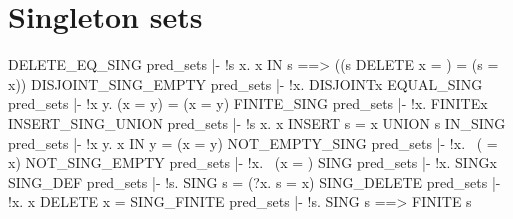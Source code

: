 \section{Singleton sets}
\THEOREM DELETE\_EQ\_SING pred\_sets
|- !s x. x IN s ==> ((s DELETE x = {}) = (s = {x}))
\ENDTHEOREM
\THEOREM DISJOINT\_SING\_EMPTY pred\_sets
|- !x. DISJOINT{x}{}
\ENDTHEOREM
\THEOREM EQUAL\_SING pred\_sets
|- !x y. ({x} = {y}) = (x = y)
\ENDTHEOREM
\THEOREM FINITE\_SING pred\_sets
|- !x. FINITE{x}
\ENDTHEOREM
\THEOREM INSERT\_SING\_UNION pred\_sets
|- !s x. x INSERT s = {x} UNION s
\ENDTHEOREM
\THEOREM IN\_SING pred\_sets
|- !x y. x IN {y} = (x = y)
\ENDTHEOREM
\THEOREM NOT\_EMPTY\_SING pred\_sets
|- !x. ~({} = {x})
\ENDTHEOREM
\THEOREM NOT\_SING\_EMPTY pred\_sets
|- !x. ~({x} = {})
\ENDTHEOREM
\THEOREM SING pred\_sets
|- !x. SING{x}
\ENDTHEOREM
\THEOREM SING\_DEF pred\_sets
|- !s. SING s = (?x. s = {x})
\ENDTHEOREM
\THEOREM SING\_DELETE pred\_sets
|- !x. {x} DELETE x = {}
\ENDTHEOREM
\THEOREM SING\_FINITE pred\_sets
|- !s. SING s ==> FINITE s
\ENDTHEOREM
